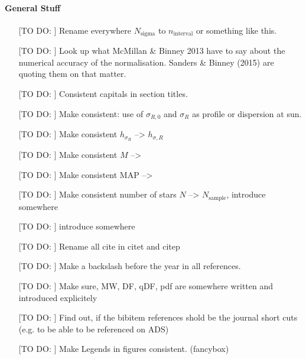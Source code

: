 \paragraph{General Stuff}
\begin{itemize}
\item[[TO DO:]] Rename everywhere $N_\text{sigma}$ to $n_\text{interval}$ or something like this.
\item[[TO DO:]] Look up what McMillan \& Binney 2013 have to say about the numerical accuracy of the normalisation. Sanders \& Binney (2015) are quoting them on that matter.
\item[[TO DO:]] Consistent capitals in section titles.
\item[[TO DO:]] Make consistent: use of $\sigma_{R,0}$ and $\sigma_R$ as profile or dispersion at sun.
\item[[TO DO:]] Make consistent $h_{\sigma_R}$ --> $h_{\sigma,R}$
\item[[TO DO:]] Make consistent $M$ --> \pmodel
\item[[TO DO:]] Make consistent MAP --> \MAP
\item[[TO DO:]] Make consistent number of stars $N$ --> $N_\text{sample}$, introduce somewhere
\item[[TO DO:]]  introduce \pdf somewhere
\item[[TO DO:]]  Rename all cite in citet and citep
\item[[TO DO:]] Make a backslash before the year in all references.
\item[[TO DO:]] Make sure, MW, DF, qDF, pdf are somewhere written and introduced explicitely
\item[[TO DO:]] Find out, if the bibitem references shold be the journal short cuts (e.g. to be able to be referenced on ADS)
\item[[TO DO:]] Make Legends in figures consistent. (fancybox)
\end{itemize}


